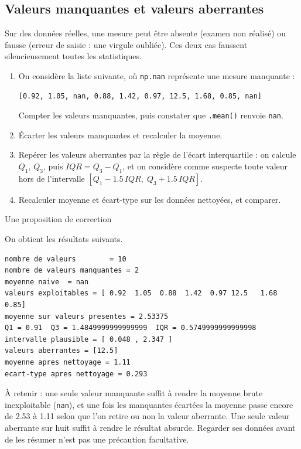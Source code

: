 \documentclass[a4paper,12pt]{article}
\begin{document}
\clearpage
\subsection{Valeurs manquantes et valeurs aberrantes}
\begin{leftbar}
Sur des données réelles, une mesure peut être absente (examen non réalisé) ou fausse (erreur de saisie : une virgule oubliée). Ces deux cas faussent silencieusement toutes les statistiques.
\begin{enumerate}
\item On considère la liste suivante, où \texttt{np.nan} représente une mesure manquante :
\begin{verbatim}
[0.92, 1.05, nan, 0.88, 1.42, 0.97, 12.5, 1.68, 0.85, nan]
\end{verbatim}
Compter les valeurs manquantes, puis constater que \texttt{.mean()} renvoie \texttt{nan}.
\item Écarter les valeurs manquantes et recalculer la moyenne.
\item Repérer les valeurs aberrantes par la règle de l'écart interquartile : on calcule $Q_1$, $Q_3$, puis $IQR=Q_3-Q_1$, et on considère comme suspecte toute valeur hors de l'intervalle $[Q_1-1.5\,IQR,\;Q_3+1.5\,IQR]$.
\item Recalculer moyenne et écart-type sur les données nettoyées, et comparer.
\end{enumerate}
\end{leftbar}
Une proposition de correction

On obtient les résultats suivants.
\begin{verbatim}
nombre de valeurs        = 10
nombre de valeurs manquantes = 2
moyenne naive  = nan
valeurs exploitables = [ 0.92  1.05  0.88  1.42  0.97 12.5   1.68  0.85]
moyenne sur valeurs presentes = 2.53375
Q1 = 0.91  Q3 = 1.4849999999999999  IQR = 0.5749999999999998
intervalle plausible = [ 0.048 , 2.347 ]
valeurs aberrantes = [12.5]
moyenne apres nettoyage = 1.11
ecart-type apres nettoyage = 0.293
\end{verbatim}
\begin{leftbar}
À retenir : une seule valeur manquante suffit à rendre la moyenne brute inexploitable (\texttt{nan}), et une fois les manquantes écartées la moyenne passe encore de 2.53 à 1.11 selon que l'on retire ou non la valeur aberrante. Une seule valeur aberrante sur huit suffit à rendre le résultat absurde. Regarder ses données avant de les résumer n'est pas une précaution facultative.
\end{leftbar}
\end{document}
